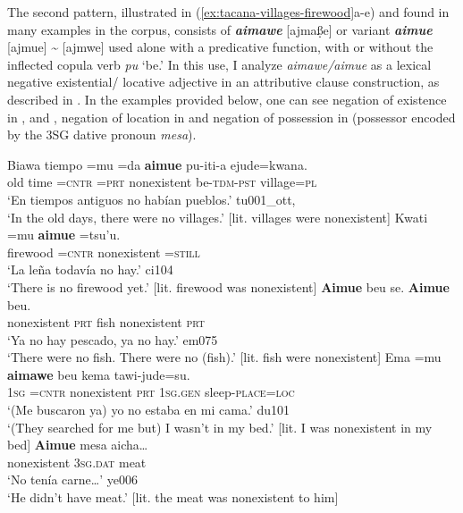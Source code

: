 \documentclass[output=paper,draft,draftmode,colorlinks,citecolor=brown]{langscibook}
\begin{document}
The second pattern, illustrated in (\ref{ex:tacana-villages-firewood}a-e)
and found in many examples in the corpus, consists of
\textbf{\textit{aimawe}} [ajma\d{ß}e]  or variant \textbf{\textit{aimue}}
[ajmue] {\textasciitilde} [ajmwe] used alone with a predicative function,
with or without the inflected copula verb \textit{pu} `be.' In this use, I
analyze \textit{aimawe\slash aimue} as a lexical negative existential\slash
locative adjective in an attributive clause construction, as described in
. In the examples provided below, one can see
negation of existence in ,  and , negation of location in
 and negation of possession in  (possessor encoded by the 3SG dative pronoun \textit{mesa}).

\begin{exe}\ex\label{ex:tacana-villages-firewood}\begin{xlist}
\ex\label{ex:tacana-villages}
\gll {\ob}Biawa tiempo{\cb} =mu =da \textbf{aimue}
pu-iti-a ejude=kwana.\\
    old  time  =\textsc{cntr}  \textsc{=prt}  nonexistent
    be-\textsc{tdm-pst}  village=\textsc{pl}\\
\glt `En tiempos antiguos no habían pueblos.' tu001\_ott, \citep[8--9]{Ottaviano1989}\\
`In the old days, there were no villages.' [lit. villages were nonexistent]
\ex\label{ex:tacana-firewood}
\gll {}Kwati  =mu \textbf{aimue}  =tsu'u.\\
    firewood  =\textsc{cntr}  nonexistent  =\textsc{still}\\
\glt `La leña todavía no hay.' ci104\\
`There is no firewood yet.' [lit. firewood was nonexistent]
\ex\label{ex:tacana-nofish}
\gll {}\textbf{Aimue}  beu se. \textbf{Aimue}  beu.\\
    nonexistent  \textsc{prt}  fish  nonexistent  \textsc{prt}\\
\glt `Ya no hay pescado, ya no hay.' em075\\
`There were no fish. There were no (fish).' [lit. fish were nonexistent]
\ex\label{ex:tacana-mybed}
\gll {}Ema  =mu \textbf{aimawe}  beu
 kema tawi-jude=su{\cb}.\\
    \textsc{1sg}  \textsc{=cntr}  nonexistent  \textsc{prt}
    \textsc{1sg.gen}  sleep-\textsc{place=loc}\\
\glt `(Me buscaron ya) yo no estaba en mi cama.' du101\\
`(They searched for me but) I wasn't in my bed.' [lit. I was nonexistent in my bed]
\ex\label{ex:tacana-no-meat}
\gll {}\textbf{Aimue} mesa aicha…\\
    nonexistent  \textsc{3sg.dat}  meat\\
\glt `No tenía carne…' ye006\\
`He didn't have meat.' [lit. the meat was nonexistent to him]
\end{xlist}\end{exe}
\end{document}
